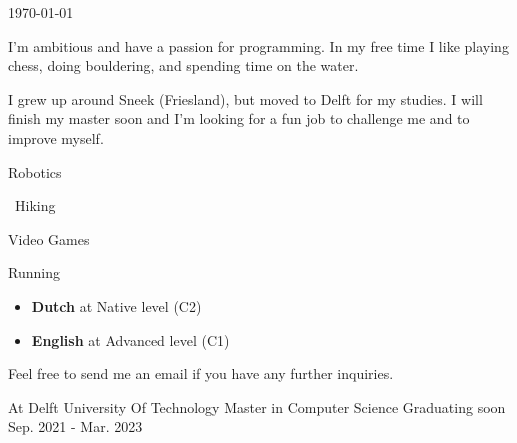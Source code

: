 \documentclass[11pt, a4paper]{awesome-cv}
\begin{document}
\makecvheader

\makecvfooter
  {\today}
  {}
  {}
  
\begin{paracol}{2}
	
	\begin{cvparagraph}
		I'm ambitious and have a passion for programming. In my free time I like playing chess, doing bouldering, and spending time on the water. 
		
		I grew up around Sneek (Friesland), but moved to Delft for my studies. I will finish my master soon and I'm looking for a fun job to challenge me and to improve myself.
	\end{cvparagraph}

	
	\begin{cvparagraph}
		\begin{description}[leftmargin=*]
			\item[] \faRobot \hspace*{0.1cm} Robotics
			\item[] \faHiking \hspace*{0.15cm} \, Hiking
			\item[] \faGamepad \hspace*{0.1cm} Video Games
			\item[] \faRunning \hspace*{0.20cm} Running
		\end{description}
	\end{cvparagraph}
	
	\cvsection{Languages}
	
	\begin{cvparagraph}
		\begin{itemize}[leftmargin=*]
			\item \textbf{Dutch} at Native level (C2)
			\item \textbf{English} at Advanced level (C1)
		\end{itemize}
	\end{cvparagraph}

	\cvsection{Contact}
	
	\begin{cvparagraph}
		Feel free to send me an email if you have any further inquiries.
	\end{cvparagraph}

	
	\switchcolumn
	
	\begin{cventries}
		\shortcventry
		{At Delft University Of Technology}
		{Master in Computer Science}
		{Graduating soon}
		{Sep. 2021 - Mar. 2023}
		

\end{cventries}
\end{paracol}
\end{document}
